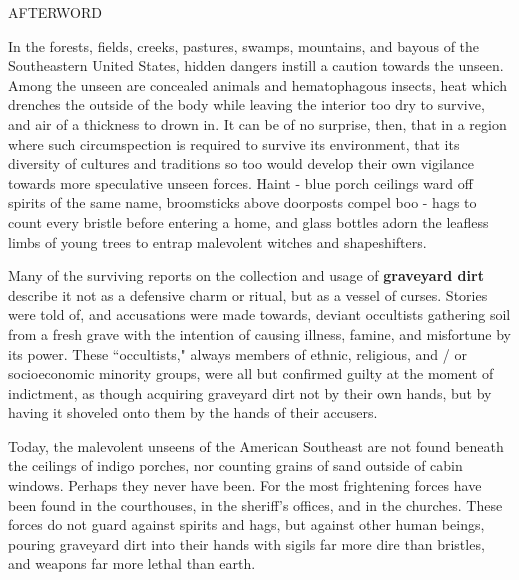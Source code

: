 \documentclass[12pt]{article}
\begin{document}
\vspace*{3\baselineskip}

\begin{center}
\huge AFTERWORD
\end{center}

\vspace*{2\baselineskip}

\begingroup
\hspace{10mm} In the forests, fields, creeks, pastures, swamps, mountains, and bayous of the Southeastern United States, hidden dangers instill a caution towards the unseen. Among the unseen are concealed animals and hematophagous insects, heat which drenches the outside of the body while leaving the interior too dry to survive, and air of a thickness to drown in. It can be of no surprise, then, that in a region where such circumspection is required to survive its environment, that its diversity of cultures and traditions so too would develop their own vigilance towards more speculative unseen forces. Haint - blue porch ceilings ward off spirits of the same name, broomsticks above doorposts compel boo - hags to count every bristle before entering a home, and glass bottles adorn the leafless limbs of young trees to entrap malevolent witches and shapeshifters. 
\endgroup

\begingroup
\hspace{10mm} Many of the surviving reports on the collection and usage of \textbf{graveyard dirt} describe it not as a defensive charm or ritual, but as a vessel of curses. Stories were told of, and accusations were made towards, deviant occultists gathering soil from a fresh grave with the intention of causing illness, famine, and misfortune by its power. These ``occultists," always members of ethnic, religious, and / or socioeconomic minority groups, were all but confirmed guilty at the moment of indictment, as though acquiring graveyard dirt not by their own hands, but by having it shoveled onto them by the hands of their accusers.
\endgroup

\begingroup
\hspace{10mm} Today, the malevolent unseens of the American Southeast are not found beneath the ceilings of indigo porches, nor counting grains of sand outside of cabin windows. Perhaps they never have been. For the most frightening forces have been found in the courthouses, in the sheriff's offices, and in the churches. These forces do not guard against spirits and hags, but against other human beings, pouring graveyard dirt into their hands with sigils far more dire than bristles, and weapons far more lethal than earth. 
\endgroup
\end{document}
